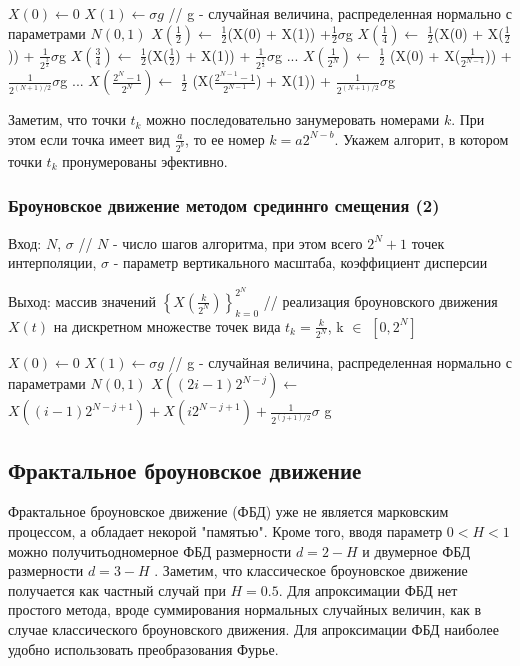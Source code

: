 \begin{algorithmic}[1]
	\State $X(0)\gets 0$
	\State $X(1)\gets \sigma g$ // g - случайная величина, распределенная нормально с параметрами $N(0,1)$
	\State $X(\frac{1}{2})\gets$ $\frac{1}{2}$(X(0) + X(1)) +$\frac{1}{2}$$\sigma$g
	\State $X(\frac{1}{4})\gets$ $\frac{1}{2}$(X(0) + X($\frac{1}{2}$)) + $\frac{1}{2^{\frac{3}{2}}}$$\sigma$g
	\State $X(\frac{3}{4})\gets$ $\frac{1}{2}$(X($\frac{1}{2}$) + X(1)) + $\frac{1}{2^{\frac{3}{2}}}$$\sigma$g
	\Statex
	...
	\State $X(\frac{1}{2^N})\gets$ $\frac{1}{2}$ (X(0) + X($\frac{1}{2^{N - 1}}$)) + $\frac{1}{2^{(N + 1) / 2}}$$\sigma$g
	\Statex
	...
	\State $X(\frac{2^N - 1}{2^N})\gets$  $\frac{1}{2}$ (X($\frac{2^{N - 1} - 1}{2^{N - 1}}$) + X(1)) + $\frac{1}{2^{(N + 1) / 2}}$$\sigma$g
\end{algorithmic}
	
	Заметим, что точки $t_k$ можно последовательно занумеровать номерами $k$. При этом если точка имеет вид $\frac{a}{2^b}$, то ее номер $k = a2^{N-b}$. Укажем алгорит, в котором точки $t_k$ пронумерованы эфективно.
	
\subsubsection{Броуновское движение методом срединнго смещения (2)}

Вход: $N$, 	$\sigma$ // $N$ - число шагов алгоритма, при этом всего $2^N + 1$ точек интерполяции, $\sigma$ - параметр вертикального масштаба, коэффициент дисперсии

Выход: массив значений $\left\{X(\frac{k}{2^N})\right\}_{k=0}^{2^N}$ // реализация броуновского движения $X(t)$ на дискретном множестве точек вида $t_k = \frac{k}{2^N}$, k $\in$ $[0, 2^N]$

\begin{algorithmic}[1]
	\State $X(0)\gets 0$
	\State $X(1)\gets \sigma g$ // g - случайная величина, распределенная нормально с параметрами $N(0,1)$
		\State $X((2i - 1) 2^{N - j})$$\gets$ $X((i - 1)2^{N-j+1}) + X(i2^{N - j + 1}) + \frac{1}{2^{(j+1)/2}}$$\sigma$ g
		\EndFor
	\EndFor
\end{algorithmic}

\subsection{Фрактальное броуновское движение}

Фрактальное броуновское движение (ФБД) уже не является марковским процессом, а обладает некорой "памятью". Кроме того, вводя параметр $0 < H < 1$ можно получитьодномерное ФБД размерности $d = 2 - H$ и двумерное ФБД размерности $d = 3 - H$ .
Заметим, что классическое броуновское движение получается как частный случай при $H = 0.5$. Для апроксимации ФБД нет простого метода, вроде суммирования нормальных случайных величин, как в случае классического броуновского движения. Для апроксимации ФБД наиболее удобно использовать преобразования Фурье.

